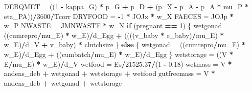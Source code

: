 \documentclass[]{article}
\newenvironment{Shaded}{\begin{snugshade}}{\end{snugshade}}
\newcommand{\DecValTok}[1]{\textcolor[rgb]{0.00,0.00,0.81}{#1}}
\newcommand{\FloatTok}[1]{\textcolor[rgb]{0.00,0.00,0.81}{#1}}
\newcommand{\StringTok}[1]{\textcolor[rgb]{0.31,0.60,0.02}{#1}}
\newcommand{\ControlFlowTok}[1]{\textcolor[rgb]{0.13,0.29,0.53}{\textbf{#1}}}
\newcommand{\OperatorTok}[1]{\textcolor[rgb]{0.81,0.36,0.00}{\textbf{#1}}}
\newcommand{\NormalTok}[1]{#1}
\begin{document}
\begin{Shaded}
\begin{Highlighting}[]
{{{\NormalTok{    DEBQMET =}\StringTok{ }\NormalTok{((}\DecValTok{1} \OperatorTok{-}\StringTok{ }\NormalTok{kappa_G) }\OperatorTok{*}\StringTok{ }\NormalTok{p_G }\OperatorTok{+}\StringTok{ }\NormalTok{p_D }\OperatorTok{+}\StringTok{ }\NormalTok{(p_X }\OperatorTok{-}\StringTok{ }\NormalTok{p_A }\OperatorTok{-}\StringTok{ }\NormalTok{p_A }\OperatorTok{*}\StringTok{ }
\StringTok{        }\NormalTok{mu_P }\OperatorTok{*}\StringTok{ }\NormalTok{eta_PA))}\OperatorTok{/}\DecValTok{3600}\OperatorTok{/}\NormalTok{Tcorr}
\NormalTok{    DRYFOOD =}\StringTok{ }\OperatorTok{-}\DecValTok{1} \OperatorTok{*}\StringTok{ }\NormalTok{JOJx }\OperatorTok{*}\StringTok{ }\NormalTok{w_X}
\NormalTok{    FAECES =}\StringTok{ }\NormalTok{JOJp }\OperatorTok{*}\StringTok{ }\NormalTok{w_P}
\NormalTok{    NWASTE =}\StringTok{ }\NormalTok{JMNWASTE }\OperatorTok{*}\StringTok{ }\NormalTok{w_N}
    \ControlFlowTok{if}\NormalTok{ (pregnant }\OperatorTok{==}\StringTok{ }\DecValTok{1}\NormalTok{) \{}
\NormalTok{        wetgonad =}\StringTok{ }\NormalTok{((cumrepro}\OperatorTok{/}\NormalTok{mu_E) }\OperatorTok{*}\StringTok{ }\NormalTok{w_E)}\OperatorTok{/}\NormalTok{d_Egg }\OperatorTok{+}\StringTok{ }\NormalTok{((((v_baby }\OperatorTok{*}\StringTok{ }
\StringTok{            }\NormalTok{e_baby)}\OperatorTok{/}\NormalTok{mu_E) }\OperatorTok{*}\StringTok{ }\NormalTok{w_E)}\OperatorTok{/}\NormalTok{d_V }\OperatorTok{+}\StringTok{ }\NormalTok{v_baby) }\OperatorTok{*}\StringTok{ }\NormalTok{clutchsize}
\NormalTok{    \}}
    \ControlFlowTok{else}\NormalTok{ \{}
\NormalTok{        wetgonad =}\StringTok{ }\NormalTok{((cumrepro}\OperatorTok{/}\NormalTok{mu_E) }\OperatorTok{*}\StringTok{ }\NormalTok{w_E)}\OperatorTok{/}\NormalTok{d_Egg }\OperatorTok{+}\StringTok{ }\NormalTok{((cumbatch}\OperatorTok{/}\NormalTok{mu_E) }\OperatorTok{*}\StringTok{ }
\StringTok{            }\NormalTok{w_E)}\OperatorTok{/}\NormalTok{d_Egg}
\NormalTok{    \}}
\NormalTok{    wetstorage =}\StringTok{ }\NormalTok{((V }\OperatorTok{*}\StringTok{ }\NormalTok{E}\OperatorTok{/}\NormalTok{mu_E) }\OperatorTok{*}\StringTok{ }\NormalTok{w_E)}\OperatorTok{/}\NormalTok{d_V}
\NormalTok{    wetfood =}\StringTok{ }\NormalTok{Es}\OperatorTok{/}\FloatTok{21525.37}\OperatorTok{/}\NormalTok{(}\DecValTok{1} \OperatorTok{-}\StringTok{ }\FloatTok{0.18}\NormalTok{)}
\NormalTok{    wetmass =}\StringTok{ }\NormalTok{V }\OperatorTok{*}\StringTok{ }\NormalTok{andens_deb }\OperatorTok{+}\StringTok{ }\NormalTok{wetgonad }\OperatorTok{+}\StringTok{ }\NormalTok{wetstorage }\OperatorTok{+}\StringTok{ }\NormalTok{wetfood}
\NormalTok{    gutfreemass =}\StringTok{ }\NormalTok{V }\OperatorTok{*}\StringTok{ }\NormalTok{andens_deb }\OperatorTok{+}\StringTok{ }\NormalTok{wetgonad }\OperatorTok{+}\StringTok{ }\NormalTok{wetstorage}
}}}
\end{Highlighting}
\end{Shaded}
\end{document}
